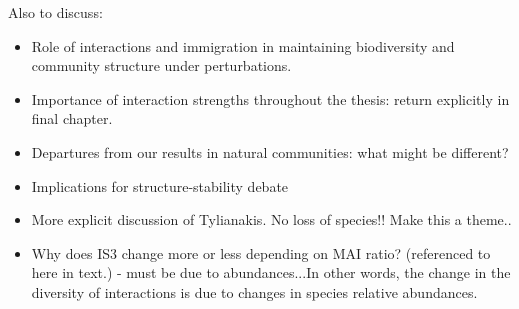 Also to discuss:
\begin{itemize}
	\item Role of interactions and immigration in maintaining biodiversity and community structure under perturbations.
	
	\item Importance of interaction strengths throughout the thesis: return explicitly in final chapter. 
	
	\item Departures from our results in natural communities: what might be different?
	
	\item Implications for structure-stability debate
	
	\item More explicit discussion of Tylianakis. No loss of species!! Make this a theme.. 
	
	\item Why does IS3 change more or less depending on MAI ratio? (referenced to here in text.) - must be due to abundances...In other words, the change in the diversity of interactions is due to changes in species relative abundances.
\end{itemize}  







